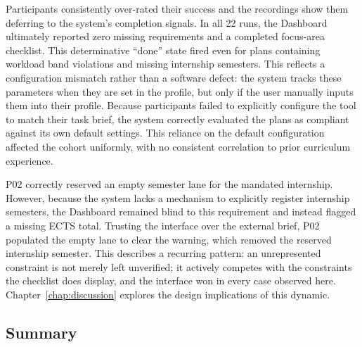 Participants consistently over-rated their success and the recordings show them deferring to the system's completion signals. In all 22 runs, the Dashboard ultimately reported zero missing requirements and a completed focus-area checklist. This determinative \enquote{done} state fired even for plans containing workload band violations and missing internship semesters. This reflects a configuration mismatch rather than a software defect: the system tracks these parameters when they are set in the profile, but only if the user manually inputs them into their profile. Because participants failed to explicitly configure the tool to match their task brief, the system correctly evaluated the plans as compliant against its own default settings. This reliance on the default configuration affected the cohort uniformly, with no consistent correlation to prior curriculum experience.

P02 correctly reserved an empty semester lane for the mandated internship. However, because the system lacks a mechanism to explicitly register internship semesters, the Dashboard remained blind to this requirement and instead flagged a missing ECTS total. Trusting the interface over the external brief, P02 populated the empty lane to clear the warning, which removed the reserved internship semester. This describes a recurring pattern: an unrepresented constraint is not merely left unverified; it actively competes with the constraints the checklist does display, and the interface won in every case observed here. Chapter~\ref{chap:discussion} explores the design implications of this dynamic.

\subsection{Summary}
\label{sec:eval-summary}


